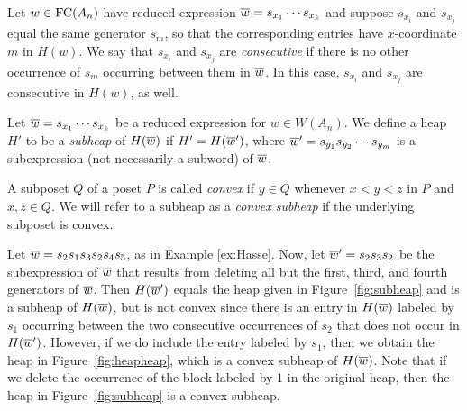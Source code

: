 



Let $w \in \operatorname{FC}(A_n)$ have reduced expression $\overline{w}=s_{x_1}\cdots s_{x_k}$ and suppose $s_{x_i}$ and $s_{x_j}$ equal the same generator $s_m$, so that the corresponding entries have $x$-coordinate $m$ in $H(w)$.  We say that $s_{x_i}$ and $s_{x_j}$ are \emph{consecutive} if there is no other occurrence of $s_{m}$ occurring between them in $\overline{w}$.  In this case, $s_{x_i}$ and $s_{x_j}$ are consecutive in $H(w)$, as well.

Let $\overline{w}=s_{x_{1}} \cdots s_{x_{k}}$ be a reduced expression for $w \in W(A_{n})$.  We define a heap $H'$ to be a \emph{subheap} of $H(\overline{w})$ if $H'=H(\overline{w}')$, where $\overline{w}'=s_{y_1}s_{y_2} \cdots s_{y_m}$ is a subexpression (not necessarily a subword) of $\overline{w}$.  

A subposet $Q$ of a poset $P$ is called \emph{convex} if $y \in Q$ whenever $x < y < z$ in $P$ and $x, z \in Q$.  We will refer to a subheap as a \emph{convex subheap} if the underlying subposet is convex.  

\begin{example}
Let $\overline{w}= s_{2}s_{1} s_{3}s_{2} s_{4}s_{5}$, as in Example \ref{ex:Hasse}.  Now, let $\overline{w}'=s_{2}s_{3}s_{2}$ be the subexpression of $\overline{w}$ that results from deleting all but the first, third, and fourth generators of $\overline{w}$.  Then $H(\overline{w}')$ equals the heap given in Figure~\ref{fig:subheap} and is a subheap of $H(\overline{w})$, but is not convex since there is an entry in $H(\overline{w})$ labeled by $s_{1}$ occurring between the two consecutive occurrences of $s_{2}$ that does not occur in $H(\overline{w}')$.  However, if we do include the entry labeled by $s_{1}$, then we obtain the heap in Figure~\ref{fig:heapheap}, which is a convex subheap of $H(\overline{w})$. Note that if we delete the occurrence of the block labeled by $1$ in the original heap, then the heap in Figure~\ref{fig:subheap} is a convex subheap.
\end{example}

